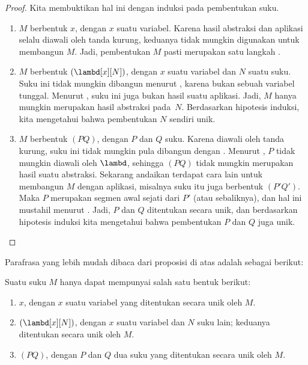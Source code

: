 \documentclass[../../../include/open-logic-section]{subfiles}
\begin{document}
\begin{proof}
  Kita membuktikan hal ini dengan induksi pada pembentukan suku.
  \begin{enumerate}
    \item $M$ berbentuk
      $x$, dengan $x$ suatu variabel. Karena hasil abstraksi dan aplikasi
      selalu diawali oleh tanda kurung, keduanya tidak mungkin digunakan untuk
      membangun $M$. Jadi, pembentukan $M$ pasti merupakan satu langkah
      .
    \item $M$ berbentuk $(\lambd[x][N])$, dengan $x$ suatu variabel dan $N$
      suatu suku. Suku ini tidak mungkin dibangun menurut
      , karena bukan sebuah
      variabel tunggal. Menurut , suku ini juga bukan
      hasil suatu aplikasi. Jadi, $M$ hanya mungkin merupakan hasil abstraksi
      pada~$N$. Berdasarkan hipotesis induksi, kita mengetahui bahwa
      pembentukan $N$ sendiri unik.
    \item $M$ berbentuk $(PQ)$, dengan $P$ dan $Q$ suku. Karena diawali oleh
      tanda kurung, suku ini tidak mungkin pula dibangun dengan
      . Menurut
      , $P$ tidak mungkin diawali oleh $\lambd$, sehingga
      $(PQ)$ tidak mungkin merupakan hasil suatu abstraksi. Sekarang andaikan
      terdapat cara lain untuk membangun $M$ dengan aplikasi, misalnya suku
      itu juga berbentuk $(P'Q')$. Maka $P$ merupakan segmen awal sejati dari
      $P'$ (atau sebaliknya), dan hal ini mustahil menurut
      .
      Jadi, $P$ dan $Q$ ditentukan secara unik, dan berdasarkan hipotesis
      induksi kita mengetahui bahwa pembentukan $P$ dan $Q$ juga unik.
  \end{enumerate}
\end{proof}

Parafrasa yang lebih mudah dibaca dari proposisi di atas adalah sebagai
berikut:
\begin{prop}
  Suatu suku $M$ hanya dapat mempunyai salah satu bentuk berikut:
  \begin{enumerate}
    \item $x$, dengan $x$ suatu variabel yang ditentukan secara unik oleh $M$.
    \item $(\lambd[x][N])$, dengan $x$ suatu variabel dan $N$ suku lain;
      keduanya ditentukan secara unik oleh $M$.
    \item $(PQ)$, dengan $P$ dan $Q$ dua suku yang ditentukan secara unik
      oleh $M$.
  \end{enumerate}
\end{prop}
\end{document}
